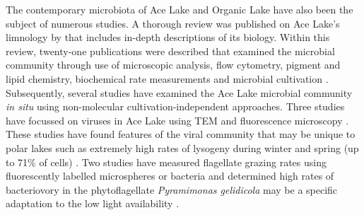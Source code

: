 The contemporary microbiota of Ace Lake and Organic Lake have also been the subject of numerous studies.
A thorough review was published on Ace Lake's limnology by \citet{Rankin1999} that includes in-depth descriptions of its biology.
Within this review, twenty-one publications were described that examined the microbial community through use of microscopic analysis, flow cytometry, pigment and lipid chemistry, biochemical rate measurements and microbial cultivation \cite{Rankin1999}.
Subsequently, several studies have examined the Ace Lake microbial community \emph{in situ} using non-molecular cultivation-independent approaches.
Three studies have focussed on viruses in Ace Lake using \ac{TEM} and fluorescence microscopy \cite{Laybourn-Parry2001, Madan2005, Laybourn-Parry2007}.
These studies have found features of the viral community that may be unique to polar lakes such as extremely high rates of lysogeny during winter and spring (up to 71\% of cells) \cite{Laybourn-Parry2007}.
Two studies have measured flagellate grazing rates using fluorescently labelled microspheres or bacteria and determined high rates of bacteriovory in the phytoflagellate \emph{Pyramimonas gelidicola} may be a specific adaptation to the low light availability \cite{Bell2003, Laybourn-Parry2005}.

